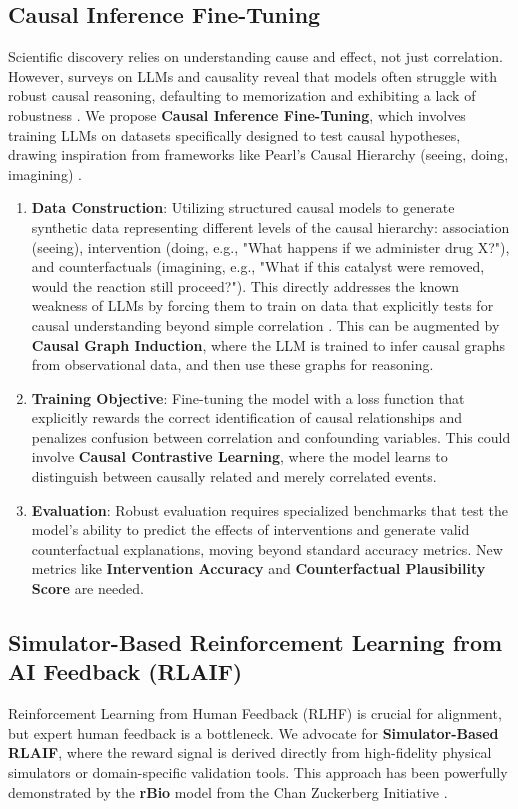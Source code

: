 \documentclass{article}
\begin{document}
\subsection{Causal Inference Fine-Tuning}
Scientific discovery relies on understanding cause and effect, not just correlation. However, surveys on LLMs and causality reveal that models often struggle with robust causal reasoning, defaulting to memorization and exhibiting a lack of robustness \cite{ma2025causal}. We propose \textbf{Causal Inference Fine-Tuning}, which involves training LLMs on datasets specifically designed to test causal hypotheses, drawing inspiration from frameworks like Pearl's Causal Hierarchy (seeing, doing, imagining) \cite{pearl2009causality}.

\begin{enumerate}
    \item \textbf{Data Construction}: Utilizing structured causal models to generate synthetic data representing different levels of the causal hierarchy: association (seeing), intervention (doing, e.g., "What happens if we administer drug X?"), and counterfactuals (imagining, e.g., "What if this catalyst were removed, would the reaction still proceed?"). This directly addresses the known weakness of LLMs by forcing them to train on data that explicitly tests for causal understanding beyond simple correlation \cite{ma2025causal}. This can be augmented by \textbf{Causal Graph Induction}, where the LLM is trained to infer causal graphs from observational data, and then use these graphs for reasoning.
    \item \textbf{Training Objective}: Fine-tuning the model with a loss function that explicitly rewards the correct identification of causal relationships and penalizes confusion between correlation and confounding variables. This could involve \textbf{Causal Contrastive Learning}, where the model learns to distinguish between causally related and merely correlated events.
    \item \textbf{Evaluation}: Robust evaluation requires specialized benchmarks that test the model's ability to predict the effects of interventions and generate valid counterfactual explanations, moving beyond standard accuracy metrics. New metrics like \textbf{Intervention Accuracy} and \textbf{Counterfactual Plausibility Score} are needed.
\end{enumerate}

\subsection{Simulator-Based Reinforcement Learning from AI Feedback (RLAIF)}
Reinforcement Learning from Human Feedback (RLHF) is crucial for alignment, but expert human feedback is a bottleneck. We advocate for \textbf{Simulator-Based RLAIF}, where the reward signal is derived directly from high-fidelity physical simulators or domain-specific validation tools. This approach has been powerfully demonstrated by the \textbf{rBio} model from the Chan Zuckerberg Initiative \cite{cziblog2025rbio}.
\end{document}
